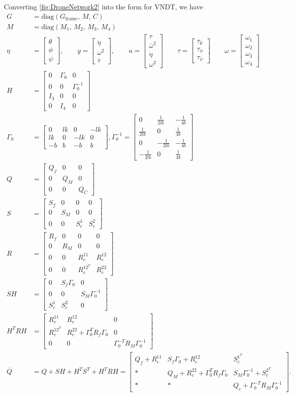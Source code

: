 \documentclass[10pt]{article}
\theoremstyle{definition}
\newcommand{\bmat}[1]{\begin{bmatrix} #1 \end{bmatrix}} %
\begin{document}
Converting \autoref{fig:DroneNetwork2} into the form for VNDT, we have
\begin{align*}
	G &= \mbox{diag}(G_\mathrm{frame},\, M,\, C) \\
	M &= \mbox{diag}(M_1,\,M_2,\,M_3,\,M_4) \\
	\eta&= \bmat{\theta \\ \phi \\ \psi}, \qquad y = \bmat{\dot{\eta} \\ \omega^2 \\ \overline{\tau}}, \qquad u = \bmat{\tau \\ \overline{\omega}^2 \\ \dot{\eta} \\ \omega^2} \qquad  \tau = \bmat{\tau_\theta \\ \tau_\phi \\ \tau_\psi} \qquad \omega = \bmat{\omega_1 \\ \omega_2 \\ \omega_3 \\ \omega_4}\\
	H &= \bmat{0 & \Gamma_0 & 0 \\ 0 & 0 & \Gamma_0^{-1} \\ I_3 & 0 & 0 \\ 0 & I_4 & 0} \\
	\Gamma_0 &= \bmat{0 & lk & 0 & -lk \\ lk & 0 & -lk & 0 \\ -b & b & -b & b}, \Gamma_0^{-1} = \bmat{0 & \frac{1}{2lk} & -\frac{1}{4b} \\ \frac{1}{2lk} & 0 & \frac{1}{4b} \\ 0 & -\frac{1}{2lk} & -\frac{1}{4b} \\ -\frac{1}{2lk} & 0 & \frac{1}{4b}} \\
	Q &= \bmat{Q_f & 0 & 0 \\ 0 & Q_M & 0 \\ 0 & 0 & Q_C} \\
	S &= \bmat{S_f & 0 & 0 & 0 \\ 0 & S_M & 0 & 0 \\ 0 & 0 & S_c^1 & S_c^2} \\
	R &= \bmat{R_f & 0 & 0 & 0 \\ 0 & R_M & 0 & 0 \\ 0 & 0 & R_c^{11} & R_c^{12} \\ 0 & 0 & R_c^{{12}^T} & R_c^{22}} \\
	SH &= \bmat{0 & S_f\Gamma_0 & 0 \\ 0 & 0 & S_M\Gamma_0^{-1} \\ S_c^1 & S_c^2 & 0} \\
	H^TRH &= \bmat{R_c^{11} & R_c^{12} & 0 \\ R_c^{{12}^T} & R_c^{22} + \Gamma_0^TR_f\Gamma_0 & 0 \\ 0 & 0 & \Gamma_0^{-T}R_M\Gamma_0^{-1}} \\
	\overline{Q} &= Q + SH + H^TS^T + H^TRH = \bmat{Q_f + R_c^{11} & S_f\Gamma_0 + R_c^{12} & S_c^{1^T} \\ * & Q_M + R_c^{22} + \Gamma_0^TR_f\Gamma_0 & S_M\Gamma_0^{-1} + S_c^{2^T} \\ * & * & Q_c + \Gamma_0^{-T}R_M\Gamma_0^{-1}}.
\end{align*}
\end{document}
